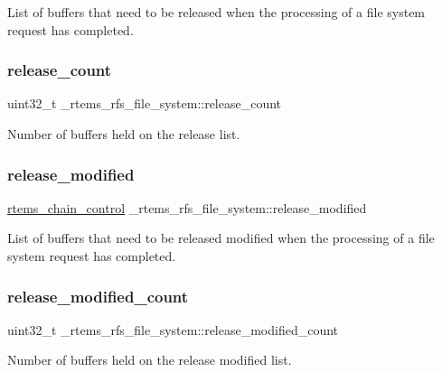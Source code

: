 List of buffers that need to be released when the processing of a file system request has completed. \mbox{\label{struct__rtems__rfs__file__system_a188f677ec5e96bd6aedfd68dc5b44426}} 
\subsubsection{\texorpdfstring{release\_count}{release\_count}}
{\footnotesize\ttfamily uint32\+\_\+t \+\_\+rtems\+\_\+rfs\+\_\+file\+\_\+system\+::release\+\_\+count}

Number of buffers held on the release list. \mbox{\label{struct__rtems__rfs__file__system_ad7115fcdfc240d1db6876011b38d4c0d}} 
\subsubsection{\texorpdfstring{release\_modified}{release\_modified}}
{\footnotesize\ttfamily \mbox{\hyperlink{unionChain__Control}{rtems\+\_\+chain\+\_\+control}} \+\_\+rtems\+\_\+rfs\+\_\+file\+\_\+system\+::release\+\_\+modified}

List of buffers that need to be released modified when the processing of a file system request has completed. \mbox{\label{struct__rtems__rfs__file__system_a1d36638b20df05929dadec7ced0ef2e5}} 
\subsubsection{\texorpdfstring{release\_modified\_count}{release\_modified\_count}}
{\footnotesize\ttfamily uint32\+\_\+t \+\_\+rtems\+\_\+rfs\+\_\+file\+\_\+system\+::release\+\_\+modified\+\_\+count}

Number of buffers held on the release modified list. \mbox{\label{struct__rtems__rfs__file__system_a581ec59c2c06db50235147913d23a2d4}} 

